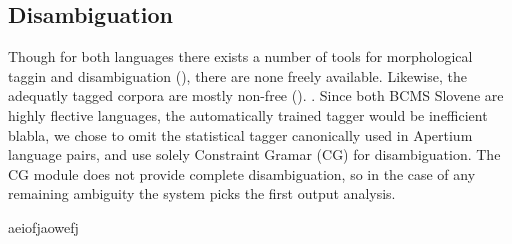 \subsection{Disambiguation}
Though for both languages there exists a number of tools for
morphological taggin and disambiguation (), there
are none freely available. Likewise, the adequatly tagged corpora are
mostly non-free (). .
Since both BCMS Slovene are highly flective languages, the
automatically trained tagger would be inefficient blabla, we chose to omit the
statistical tagger canonically used in Apertium language pairs, and
use solely Constraint Gramar (CG) for disambiguation. The CG module
does not provide complete disambiguation, so in the case of any
remaining ambiguity the system picks the first output analysis.


aeiofjaowefj
